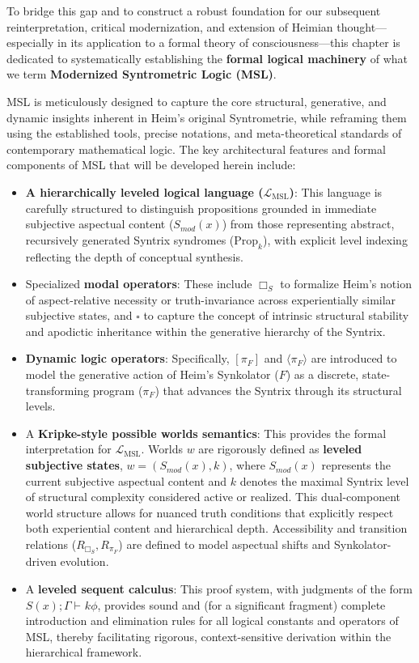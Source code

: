 \documentclass[
    12pt,              %
    a4paper,           %
    headings=normal,   %
    twoside=true,      %
    BCOR=8mm,          %
]{scrbook}
\newcommand{\Smodx}{S_{mod}(x)}
\newcommand{\LMSL}{\mathcal{L}_{\text{MSL}}}
\newcommand{\BoxS}{\Box_S}
\newcommand{\BoxSyn}{\square}
\newcommand{\piF}{\pi_F}
\newcommand{\dynboxgen}[1]{[#1]}
\newcommand{\dyndiamondgen}[1]{\langle#1\rangle}
\newcommand{\turnstilek}[1][]{\vdash^{#1}}
\newcommand{\Propk}[1]{\text{Prop}_{#1}}
\begin{document}
To bridge this gap and to construct a robust foundation for our subsequent reinterpretation, critical modernization, and extension of Heimian thought---especially in its application to a formal theory of consciousness---this chapter is dedicated to systematically establishing the \textbf{formal logical machinery} of what we term \textbf{Modernized Syntrometric Logic (MSL)}.

MSL is meticulously designed to capture the core structural, generative, and dynamic insights inherent in Heim’s original Syntrometrie, while reframing them using the established tools, precise notations, and meta-theoretical standards of contemporary mathematical logic. The key architectural features and formal components of MSL that will be developed herein include:

\begin{itemize}
    \item   \textbf{A hierarchically leveled logical language (\(\LMSL\))}: This language is carefully structured to distinguish propositions grounded in immediate subjective aspectual content (\(\Smodx\)) from those representing abstract, recursively generated Syntrix syndromes (\(\Propk{k}\)), with explicit level indexing reflecting the depth of conceptual synthesis.
    \item   Specialized \textbf{modal operators}: These include \(\BoxS\) to formalize Heim’s notion of aspect-relative necessity or truth-invariance across experientially similar subjective states, and \(\BoxSyn\) to capture the concept of intrinsic structural stability and apodictic inheritance within the generative hierarchy of the Syntrix.
    \item   \textbf{Dynamic logic operators}: Specifically, \(\dynboxgen{\piF}\) and \(\dyndiamondgen{\piF}\) are introduced to model the generative action of Heim’s Synkolator (\(F\)) as a discrete, state-transforming program (\(\piF\)) that advances the Syntrix through its structural levels.
    \item   A \textbf{Kripke-style possible worlds semantics}: This provides the formal interpretation for \(\LMSL\). Worlds \(w\) are rigorously defined as \textbf{leveled subjective states}, \(w = (\Smodx, k)\), where \(\Smodx\) represents the current subjective aspectual content and \(k\) denotes the maximal Syntrix level of structural complexity considered active or realized. This dual-component world structure allows for nuanced truth conditions that explicitly respect both experiential content and hierarchical depth. Accessibility and transition relations (\(R_{\BoxS}, R_{\piF}\)) are defined to model aspectual shifts and Synkolator-driven evolution.
    \item   A \textbf{leveled sequent calculus}: This proof system, with judgments of the form \(S(x); \Gamma \turnstilek{k} \phi\), provides sound and (for a significant fragment) complete introduction and elimination rules for all logical constants and operators of MSL, thereby facilitating rigorous, context-sensitive derivation within the hierarchical framework.
\end{itemize}
\end{document}
